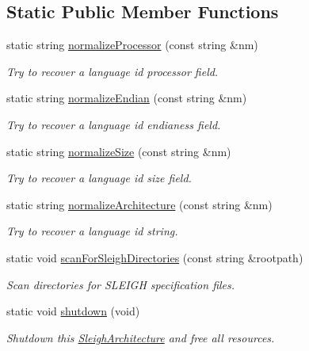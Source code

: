 \subsection*{Static Public Member Functions}
\begin{DoxyCompactItemize}
\item 
static string \mbox{\hyperlink{class_sleigh_architecture_a01c91ee1ad3c886ddc13df95502489c1}{normalize\+Processor}} (const string \&nm)
\begin{DoxyCompactList}\small\item\em Try to recover a {\itshape language} {\itshape id} processor field. \end{DoxyCompactList}\item 
static string \mbox{\hyperlink{class_sleigh_architecture_adfe35a4bb676b3676188d936eacccdb3}{normalize\+Endian}} (const string \&nm)
\begin{DoxyCompactList}\small\item\em Try to recover a {\itshape language} {\itshape id} endianess field. \end{DoxyCompactList}\item 
static string \mbox{\hyperlink{class_sleigh_architecture_a4645a63583ea3f8088e24d6fa71dce50}{normalize\+Size}} (const string \&nm)
\begin{DoxyCompactList}\small\item\em Try to recover a {\itshape language} {\itshape id} size field. \end{DoxyCompactList}\item 
static string \mbox{\hyperlink{class_sleigh_architecture_a8053081371771a941248809754fc836f}{normalize\+Architecture}} (const string \&nm)
\begin{DoxyCompactList}\small\item\em Try to recover a {\itshape language} {\itshape id} string. \end{DoxyCompactList}\item 
static void \mbox{\hyperlink{class_sleigh_architecture_a192dd872ccfe2a7f7a3ad18709fa37aa}{scan\+For\+Sleigh\+Directories}} (const string \&rootpath)
\begin{DoxyCompactList}\small\item\em Scan directories for S\+L\+E\+I\+GH specification files. \end{DoxyCompactList}\item 
static void \mbox{\hyperlink{class_sleigh_architecture_a1765d06764b5b9d284340a2c457011f8}{shutdown}} (void)
\begin{DoxyCompactList}\small\item\em Shutdown this \mbox{\hyperlink{class_sleigh_architecture}{Sleigh\+Architecture}} and free all resources. \end{DoxyCompactList}\end{DoxyCompactItemize}

